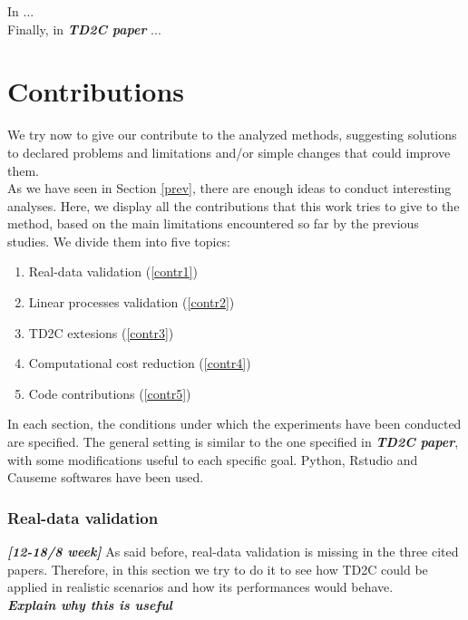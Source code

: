 In \cite{bontempi2020learning} ...\\

Finally, in \textbf{\textit{TD2C paper}} ...\\


\section{Contributions}
We try now to give our contribute to the analyzed methods, suggesting solutions to declared problems and limitations and/or simple changes that could improve them.\\

As we have seen in Section \ref{prev}, there are enough ideas to conduct interesting analyses. Here, we display all the contributions that this work tries to give to the method, based on the main limitations encountered so far by the previous studies. We divide them into five topics:
\begin{enumerate}
    \item Real-data validation (\ref{contr1})  
    \item Linear processes validation (\ref{contr2})
    \item TD2C extesions (\ref{contr3})
    \item Computational cost reduction (\ref{contr4}) 
    \item Code contributions (\ref{contr5})
\end{enumerate}

In each section, the conditions under which the experiments have been conducted are specified. The general setting is similar to the one specified in \textbf{\textit{TD2C paper}}, with some modifications useful to each specific goal. Python, Rstudio and Causeme softwares have been used.

\subsubsection{Real-data validation}
\textbf{\textit{[12-18/8 week]}}
As said before, real-data validation is missing in the three cited papers. Therefore, in this section we try to do it to see how TD2C could be applied in realistic scenarios and how its performances would behave.\\

\textbf{\textit{Explain why this is useful}}



